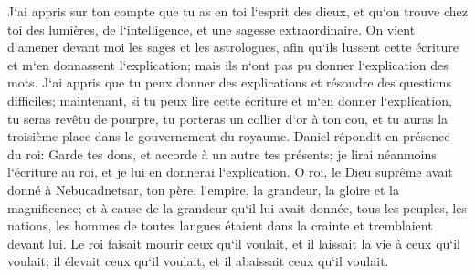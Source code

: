 \verse J`ai appris sur ton compte que tu as en toi l`esprit des dieux, et qu`on trouve chez toi des lumières, de l`intelligence, et une sagesse extraordinaire. 
\verse On vient d`amener devant moi les sages et les astrologues, afin qu`ils lussent cette écriture et m`en donnassent l`explication; mais ils n`ont pas pu donner l`explication des mots. 
\verse J`ai appris que tu peux donner des explications et résoudre des questions difficiles; maintenant, si tu peux lire cette écriture et m`en donner l`explication, tu seras revêtu de pourpre, tu porteras un collier d`or à ton cou, et tu auras la troisième place dans le gouvernement du royaume. 
\verse Daniel répondit en présence du roi: Garde tes dons, et accorde à un autre tes présents; je lirai néanmoins l`écriture au roi, et je lui en donnerai l`explication. 
\verse O roi, le Dieu suprême avait donné à Nebucadnetsar, ton père, l`empire, la grandeur, la gloire et la magnificence; 
\verse et à cause de la grandeur qu`il lui avait donnée, tous les peuples, les nations, les hommes de toutes langues étaient dans la crainte et tremblaient devant lui. Le roi faisait mourir ceux qu`il voulait, et il laissait la vie à ceux qu`il voulait; il élevait ceux qu`il voulait, et il abaissait ceux qu`il voulait. 

